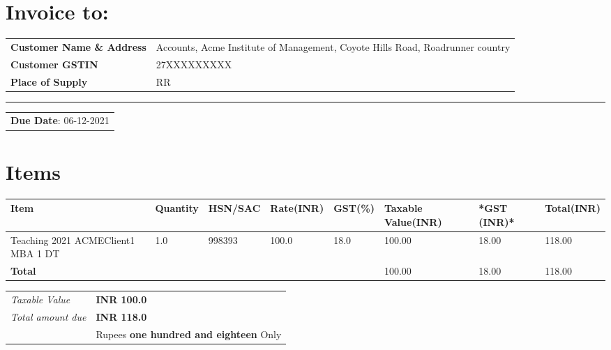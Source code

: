 \documentclass[10pt]{article}
\begin{document}
\section{Invoice to:}
\label{invoiceto}
\begin{center}
\begin{tabular}{a{3.5cm}a{10.5cm}}
\textbf{Customer Name \& Address} & Accounts, Acme Institute of Management, Coyote Hills Road, Roadrunner country\\
\textbf{Customer GSTIN} & 27XXXXXXXXX\\
\textbf{Place of Supply} & RR\\
\end{tabular}
\end{center}

\noindent\rule{\textwidth}{0.5pt}
\begin{center}
\begin{tabular}{a{4.5cm}}
\textbf{Due Date}: 06-12-2021\\
\end{tabular}
\end{center}
\section{Items}
\label{sec:org4f6d3c1}

\begin{table}[htbp]
\label{tab-items-06-11-2021}
\centering
\begin{tabular}{a{4.25cm}p{1.25cm}a{1.5cm}p{1cm}a{1.25cm}p{1.25cm}a{1.15cm}p{1.35cm}}
\textbf{Item} & \textbf{Quantity} & \textbf{HSN/SAC} & \textbf{Rate(INR)} & \textbf{GST(\%)} & \textbf{Taxable Value(INR)} & \textbf{*GST} (INR)* & \textbf{Total(INR)}\\
\hline
Teaching 2021 ACMEClient1 MBA 1 DT & 1.0 & 998393 & 100.0 & 18.0 & 100.00 & 18.00 & 118.00\\
\textbf{Total} &  &  &  &  & 100.00 & 18.00 & 118.00\\
\end{tabular}
\end{table}

\begin{center}
\begin{tabular}{la{8cm}}
\emph{Taxable Value} & \textbf{INR 100.0}\\
\emph{Total amount due} & \textbf{INR 118.0}\\
 & Rupees \textbf{one hundred and eighteen} Only\\
\end{tabular}
\end{center}
\end{document}
